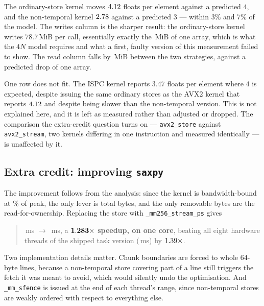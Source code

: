 \documentclass[11pt,a4paper]{article}
\newcommand{\ms}[1]{#1\,ms}
\begin{document}
\ifdefined\prognFiveTablePerf
\prognFiveTablePerf

The ordinary-store kernel moves $4.12$ floats per element
against a predicted $4$, and the non-temporal kernel
$2.78$ against a predicted $3$ --- within 3\% and 7\% of the
model. The writes column is the sharper result: the ordinary-store kernel
writes $78.7$\,MiB per call, essentially exactly the
\prognFivePerfOneArray\,MiB of one array, which is what the $4N$ model requires
and what a first, faulty version of this measurement failed to show. The read
column falls by \prognFivePerfReadDrop\,MiB between the two strategies,
against a predicted drop of one array.

One row does not fit. The ISPC kernel reports $3.47$ floats per element where
$4$ is expected, despite issuing the same ordinary stores as the AVX2 kernel
that reports $4.12$ and despite being slower than the
non-temporal version. This is not explained here, and it is left as measured
rather than adjusted or dropped. The comparison the extra-credit question turns
on --- \texttt{avx2\_store} against \texttt{avx2\_stream}, two kernels
differing in one instruction and measured identically --- is unaffected by it.
\fi

\subsection{Extra credit: improving \texttt{saxpy}}
\label{sec:prog5ec2}

The improvement follows from the analysis: since the kernel is bandwidth-bound
at \prognFiveBestFrac\% of peak, the only lever is total bytes, and the only removable bytes
are the read-for-ownership. Replacing the store with
\texttt{\_mm256\_stream\_ps} gives

\begin{quote}
\ms{\prognFiveStoreMs} $\rightarrow$ \ms{\prognFiveNtMs}, a
$\mathbf{1.283\times}$ \textbf{speedup, on one core}, beating all
eight hardware threads of the shipped task version
(\ms{\prognFiveShippedTaskMs}) by $1.39\times$.
\end{quote}

Two implementation details matter. Chunk boundaries are forced to whole
64-byte lines, because a non-temporal store covering part of a line still
triggers the fetch it was meant to avoid, which would silently undo the
optimisation. And \texttt{\_mm\_sfence} is issued at the end of each thread's
range, since non-temporal stores are weakly ordered with respect to everything
else.
\end{document}
